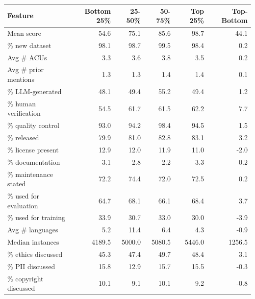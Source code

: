 \begin{tabular}{lrrrrr}
\toprule
Feature & Bottom 25\% & 25-50\% & 50-75\% & Top 25\% & Top-Bottom \\
\midrule
Mean score & 54.6 & 75.1 & 85.6 & 98.7 & 44.1 \\
\% new dataset & 98.1 & 98.7 & 99.5 & 98.4 & 0.2 \\
Avg \# ACUs & 3.3 & 3.6 & 3.8 & 3.5 & 0.2 \\
Avg \# prior mentions & 1.3 & 1.3 & 1.4 & 1.4 & 0.1 \\
\% LLM-generated & 48.1 & 49.4 & 55.2 & 49.4 & 1.2 \\
\% human verification & 54.5 & 61.7 & 61.5 & 62.2 & 7.7 \\
\% quality control & 93.0 & 94.2 & 98.4 & 94.5 & 1.5 \\
\% released & 79.9 & 81.0 & 82.8 & 83.1 & 3.2 \\
\% license present & 12.9 & 12.0 & 11.9 & 11.0 & -2.0 \\
\% documentation & 3.1 & 2.8 & 2.2 & 3.3 & 0.2 \\
\% maintenance stated & 72.2 & 74.4 & 72.0 & 72.5 & 0.2 \\
\% used for evaluation & 64.7 & 68.1 & 66.1 & 68.4 & 3.7 \\
\% used for training & 33.9 & 30.7 & 33.0 & 30.0 & -3.9 \\
Avg \# languages & 5.2 & 11.4 & 6.4 & 4.3 & -0.9 \\
Median instances & 4189.5 & 5000.0 & 5080.5 & 5446.0 & 1256.5 \\
\% ethics discussed & 45.3 & 47.4 & 49.7 & 48.4 & 3.1 \\
\% PII discussed & 15.8 & 12.9 & 15.7 & 15.5 & -0.3 \\
\% copyright discussed & 10.1 & 9.1 & 10.1 & 9.2 & -0.8 \\
\bottomrule
\end{tabular}
